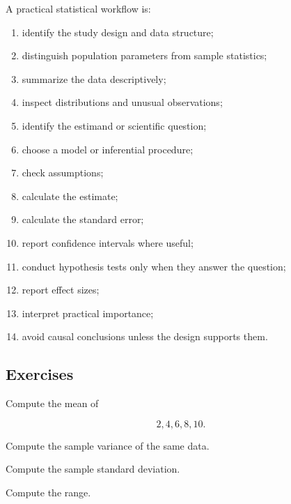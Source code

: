 A practical statistical workflow is:

\begin{enumerate}
    \item identify the study design and data structure;
    \item distinguish population parameters from sample statistics;
    \item summarize the data descriptively;
    \item inspect distributions and unusual observations;
    \item identify the estimand or scientific question;
    \item choose a model or inferential procedure;
    \item check assumptions;
    \item calculate the estimate;
    \item calculate the standard error;
    \item report confidence intervals where useful;
    \item conduct hypothesis tests only when they answer the question;
    \item report effect sizes;
    \item interpret practical importance;
    \item avoid causal conclusions unless the design supports them.
\end{enumerate}

\subsection{Exercises}
\label{subsec:statistical-tables-exercises}

\begin{exercise}[1]
Compute the mean of

\[
2,4,6,8,10.
\]
\end{exercise}

\begin{exercise}[1]
Compute the sample variance of the same data.
\end{exercise}

\begin{exercise}[1]
Compute the sample standard deviation.
\end{exercise}

\begin{exercise}[1]
Compute the range.
\end{exercise}


